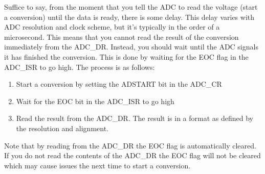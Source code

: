 Suffice to say, from the moment that you tell the ADC to read the voltage (start a conversion) until the data is ready, there is some delay. This delay varies with ADC resolution and clock scheme, but it's typically in the order of a microsecond. This means that you cannot read the result of the conversion immediately from the ADC\_DR. Instead, you should wait until the ADC signals it has finished the conversion. This is done by waiting for the EOC flag in the ADC\_ISR to go high. The process is as follows:
\begin{enumerate}
\item Start a conversion by setting the ADSTART bit in the ADC\_CR
\item Wait for the EOC bit in the ADC\_ISR to go high
\item Read the result from the ADC\_DR. The result is in a format as defined by the resolution and alignment. 
\end{enumerate}
Note that by reading from the ADC\_DR the EOC flag is automatically cleared. If you do not read the contents of the ADC\_DR the EOC flag will not be cleared which may cause issues the next time to start a conversion. 



